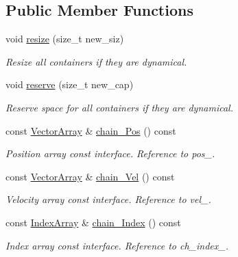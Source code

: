 \subsection*{Public Member Functions}
\begin{DoxyCompactItemize}
\item 
void \mbox{\hyperlink{class_space_h_1_1_vel_indep_chain_particles_afdf6136619e4be707bed1e9859bc7171}{resize}} (size\+\_\+t new\+\_\+siz)
\begin{DoxyCompactList}\small\item\em Resize all containers if they are dynamical. \end{DoxyCompactList}\item 
void \mbox{\hyperlink{class_space_h_1_1_vel_indep_chain_particles_a9a6b23671b53391cded80cde58b18608}{reserve}} (size\+\_\+t new\+\_\+cap)
\begin{DoxyCompactList}\small\item\em Reserve space for all containers if they are dynamical. \end{DoxyCompactList}\item 
const \mbox{\hyperlink{class_space_h_1_1_vel_indep_particles_aa9983058940249df8b00fa800e8cbad2}{Vector\+Array}} \& \mbox{\hyperlink{class_space_h_1_1_vel_indep_chain_particles_a2dd7d2f703141d0ef3d8728b2a57cb83}{chain_\+Pos}} () const
\begin{DoxyCompactList}\small\item\em Position array const interface. Reference to pos\+\_\+. \end{DoxyCompactList}\item 
const \mbox{\hyperlink{class_space_h_1_1_vel_indep_particles_aa9983058940249df8b00fa800e8cbad2}{Vector\+Array}} \& \mbox{\hyperlink{class_space_h_1_1_vel_indep_chain_particles_a741064afd96c861eac50e8de239eedaa}{chain_\+Vel}} () const
\begin{DoxyCompactList}\small\item\em Velocity array const interface. Reference to vel\+\_\+. \end{DoxyCompactList}\item 
const \mbox{\hyperlink{class_space_h_1_1_vel_indep_chain_particles_a48b9183f8d68fe8af42bf405125d450c}{Index\+Array}} \& \mbox{\hyperlink{class_space_h_1_1_vel_indep_chain_particles_a4136b399758a4547ce22024318d9b654}{chain_\+Index}} () const
\begin{DoxyCompactList}\small\item\em Index array const interface. Reference to ch\+\_\+index\+\_\+. \end{DoxyCompactList}\item 

\end{DoxyCompactItemize}
